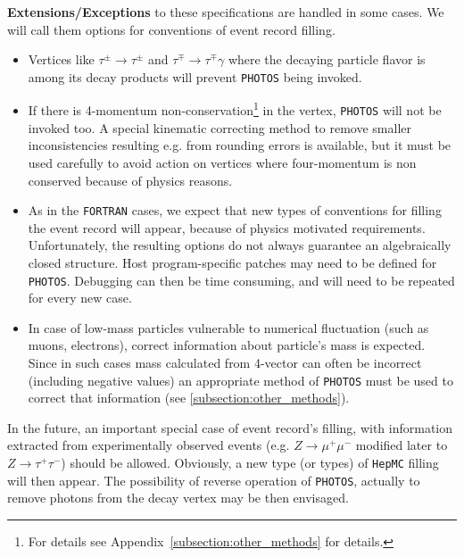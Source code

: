 \documentclass[]{Photos_interface_design}
\begin{document}
\noindent
\textbf{ Extensions/Exceptions} to these specifications are handled in some cases. We will call them
options for conventions of event record filling.
  \begin{itemize} 
    \item  Vertices like $\tau^\pm \rightarrow \tau^\pm$ and $\tau^\mp \rightarrow \tau^\mp \gamma$ 
           where the decaying particle flavor is among its decay products will prevent  {\tt PHOTOS} being invoked.

    \item  If there is  4-momentum non-conservation\footnote{For details see 
           Appendix~\ref{subsection:other_methods} for details.} in the vertex,
           {\tt PHOTOS} will not be invoked too.  A special kinematic correcting
           method to remove smaller inconsistencies resulting e.g. from 
           rounding errors is available, but it must be used carefully to avoid
           action on vertices where four-momentum is non conserved because 
           of physics reasons.

    \item
           As in the {\tt FORTRAN} cases, we expect that  new  types of 
           conventions for filling the event record
           will appear, because of physics motivated requirements.
           Unfortunately, the resulting options do not always guarantee
           an algebraically closed structure.  
           Host program-specific patches may need to be defined for
           {\tt PHOTOS}. 
           Debugging can then be time consuming, and will need to be repeated for every new
           case.
           
    \item  In case of low-mass particles vulnerable to numerical fluctuation (such as muons, electrons),
           correct information about particle's mass is expected. Since in such cases mass calculated
           from 4-vector can often be incorrect (including negative values) an appropriate method
           of {\tt PHOTOS} must be used to correct that information (see \ref{subsection:other_methods}).
   \end{itemize}


 In the future,  an important special case of event record's filling, with
information extracted from experimentally observed events (e.g. $Z\to \mu^+\mu^-$
 modified later to $Z\to \tau^+\tau^-$) should be allowed.
  Obviously, a new type (or types) of {\tt HepMC} filling will then appear.
The possibility of reverse operation of {\tt PHOTOS}, actually to remove 
photons from the decay vertex
may be then envisaged.
\end{document}
